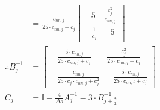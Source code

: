 \documentclass{article}
\begin{document}
\begin{align*}
	                    & = \frac{c_{nn, j}}{25\cdot c_{nn, j} + c_j}\begin{bmatrix} -5 & \frac{c^2_j}{c_{nn, j}}  \\ -\frac{1}{c_j} & -5 \end{bmatrix}                                                                                                                                                                                                                                                                                                                                                                                                                                                                                                                                                                                                                   \\
	\therefore B_j^{-1} & = \begin{bmatrix} -\frac{5\cdot c_{nn, j}}{25\cdot c_{nn, j} + c_j} & \frac{c^2_j}{25\cdot c_{nn, j} + c_j}  \\ -\frac{c_{nn, j}}{25\cdot c_j\cdot c_{nn, j} + c_j^2} & -\frac{5\cdot c_{nn, j}}{25\cdot c_{nn, j} + c_j} \end{bmatrix}                                                                                                                                                                                                                                                                                                                                                                     \\
	C_j                 & = \mathbb{I} - \frac{4}{\Delta s}A_j^{-1} - 3\cdot B_{j+\frac{2}{3}}^{-1}                                                                                                                                                                                                                                                                                                                                                                                                                                                                                                                                                                                                                                                                                             \\

\end{align*}
\end{document}
